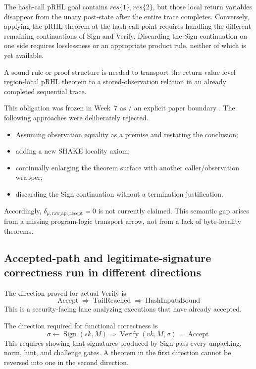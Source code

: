 The hash-call pRHL goal contains \(res\{1\},res\{2\}\), but those local return
variables disappear from the unary post-state after the entire trace completes.
Conversely, applying the pRHL theorem at the hash-call point requires handling
the different remaining continuations of Sign and Verify. Discarding the Sign
continuation on one side requires losslessness or an appropriate product rule,
neither of which is yet available.

\begin{openobligation}
A sound rule or proof structure is needed to transport the return-value-level
region-local pRHL theorem to a stored-observation relation in an already
completed sequential trace.
\end{openobligation}

This obligation was frozen in Week~7 as \statusdeferred / an explicit paper
boundary \cite{product-replay}. The following approaches were deliberately rejected.

\begin{itemize}
  \item Assuming observation equality as a premise and restating the conclusion;
  \item adding a new SHAKE locality axiom;
  \item continually enlarging the theorem surface with another caller/observation wrapper;
  \item discarding the Sign continuation without a termination justification.
\end{itemize}

Accordingly, \(\delta_{\mu,\mathrm{raw\_api\_accept}}=0\) is not currently claimed.
This semantic gap arises from a missing program-logic transport arrow, not from
a lack of byte-locality theorems.

\subsection{Accepted-path and legitimate-signature correctness run in different directions}

The direction proved for actual Verify is
\[
  \operatorname{Accept}\Longrightarrow\operatorname{TailReached}
  \Longrightarrow\operatorname{HashInputsBound}
\]
This is a security-facing lane analyzing executions that have already accepted.

The direction required for functional correctness is
\[
  \sigma\leftarrow\operatorname{Sign}(sk,M)
  \Longrightarrow
  \operatorname{Verify}(vk,M,\sigma)=\operatorname{Accept}
\]
This requires showing that signatures produced by Sign pass every
unpacking, norm, hint, and challenge gates. A theorem in the first direction cannot be reversed
into one in the second direction.

